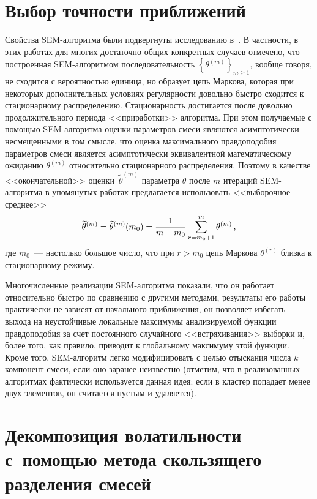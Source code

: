 \begin{multicols}{2}
\section{Выбор точности приближений}

Свойства SEM-алгоритма были подвергнуты исследованию в~\cite{Celeux, Ip}. В частности, в этих работах для
многих достаточно общих конкретных случаев отмечено, что построенная SEM-алгоритмом последовательность $\left\{
\theta^{(m)}\right\}  _{m\geq1}$, вообще говоря, не сходится с вероятностью единица, но образует цепь Маркова, которая при
некоторых дополнительных условиях регулярности довольно быстро
сходится к стационарному распределению. Стационарность достигается после довольно продолжительного\linebreak
 периода <<приработки>>  алгоритма.
При этом получаемые с помощью SEM-алгоритма оценки па\-ра\-мет\-ров смеси являются асимптотически несмещенными в том смысле, что
оценка \mbox{максимального} правдоподобия параметров смеси является асимптотически эквивалентной математическому ожиданию
$\theta^{(m)}$ относительно стационарного распределения. Поэтому в
качестве <<окончательной>> оценки~$\widetilde{\theta}^{(m)}$
параметра $\theta$ после $m$ итераций SEM-алгоритма в упомянутых
работах предлагается использовать <<выборочное среднее>>
$$
\widetilde{\theta}^{(m)}=\widetilde{\theta}^{(m)}(m_{0})=\displaystyle\frac{\displaystyle 1\mathstrut}{\displaystyle m-m_{0}\mathstrut}
\sum\limits_{r=m_{0}+1}^{m}\theta^{(m)}\,,
$$
где $m_{0}$~--- настолько большое число, что при $r>m_{0}$ цепь
Маркова $\theta^{(r)}$ близка к стационарному режиму.

Многочисленные реализации SEM-алгоритма показали, что он работает
относительно быстро по сравнению с другими методами, результаты
его работы практически не зависят от начального приближения,
он позволяет избегать выхода на неустойчивые локальные максимумы
анализируемой функции правдоподобия за счет постоянного случайного
<<встряхивания>> выборки и, более того, как правило, приводит к
глобальному максимуму этой функции. Кроме того, SEM-алгоритм легко
модифицировать с целью отыскания числа $k$ компонент смеси, если
оно заранее неизвестно (отметим, что в реализованных алгоритмах
фактически используется данная идея: если в кластер попадает менее
двух элементов, он считается пустым и удаляется).


\section{Декомпозиция волатильности с~помощью метода скользящего
разделения смесей}


\end{multicols}

